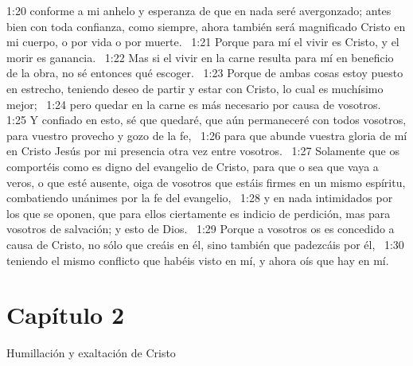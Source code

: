 1:20 conforme a mi anhelo y esperanza de que en nada seré avergonzado; antes bien con toda confianza, como siempre, ahora también será magnificado Cristo en mi cuerpo, o por vida o por muerte.  
1:21 Porque para mí el vivir es Cristo, y el morir es ganancia.  
1:22 Mas si el vivir en la carne resulta para mí en beneficio de la obra, no sé entonces qué escoger.  
1:23 Porque de ambas cosas estoy puesto en estrecho, teniendo deseo de partir y estar con Cristo, lo cual es muchísimo mejor;  
1:24 pero quedar en la carne es más necesario por causa de vosotros.  
1:25 Y confiado en esto, sé que quedaré, que aún permaneceré con todos vosotros, para vuestro provecho y gozo de la fe,  
1:26 para que abunde vuestra gloria de mí en Cristo Jesús por mi presencia otra vez entre vosotros.  
1:27 Solamente que os comportéis como es digno del evangelio de Cristo, para que o sea que vaya a veros, o que esté ausente, oiga de vosotros que estáis firmes en un mismo espíritu, combatiendo unánimes por la fe del evangelio,  
1:28 y en nada intimidados por los que se oponen, que para ellos ciertamente es indicio de perdición, mas para vosotros de salvación; y esto de Dios.  
1:29 Porque a vosotros os es concedido a causa de Cristo, no sólo que creáis en él, sino también que padezcáis por él,  
1:30 teniendo el mismo conflicto que habéis visto en mí, y ahora oís que hay en mí.  
\section*{Capítulo 2 }
Humillación y exaltación de Cristo  

